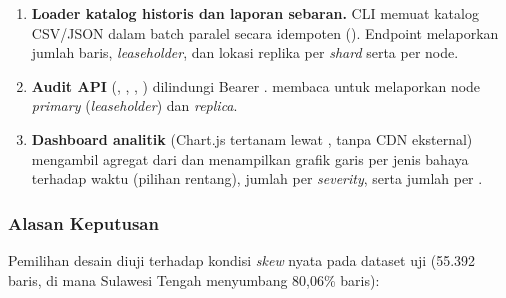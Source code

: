 \begin{enumerate}
\item \textbf{Loader katalog historis dan laporan sebaran.} CLI  memuat katalog CSV/JSON dalam batch paralel secara idempoten (). Endpoint  melaporkan jumlah baris, \textit{leaseholder}, dan lokasi replika per \textit{shard} serta per node.
\item \textbf{Audit API} (, , , ) dilindungi Bearer .  membaca  untuk melaporkan node \textit{primary} (\textit{leaseholder}) dan \textit{replica}.
\item \textbf{Dashboard analitik}  (Chart.js tertanam lewat , tanpa CDN eksternal) mengambil agregat dari  dan menampilkan grafik garis per jenis bahaya terhadap waktu (pilihan rentang), jumlah per \textit{severity}, serta jumlah per .
\end{enumerate}

\subsubsection{Alasan Keputusan}

Pemilihan desain diuji terhadap kondisi \textit{skew} nyata pada dataset uji (55.392 baris, di mana Sulawesi Tengah menyumbang 80,06\% baris):

